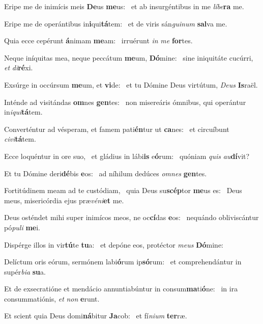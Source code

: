 \item Eripe me de inimícis meis \textbf{De}us \textbf{me}us:~\psstar{} et ab insurgéntibus in me \textit{líbe}\textbf{ra} me.
\item Eripe me de operántibus in\textbf{i}qui\textbf{tá}tem:~\psstar{} et de viris sán\textit{guinum} \textbf{sal}va me.
\item Quia ecce cepérunt \textbf{á}nimam \textbf{me}am:~\psstar{} irruérunt \textit{in} \textit{me} \textbf{for}tes.
\item Neque iníquitas mea, neque peccátum \textbf{me}um, \textbf{Dó}mine:~\psstar{} sine iniquitáte cucúrri, \textit{et} \textit{di}\textbf{ré}xi.
\item Exsúrge in occúrsum \textbf{me}um, et \textbf{vi}de:~\psstar{} et tu Dómine Deus virtútum, \textit{Deus} \textbf{Is}raël.
\item Inténde ad visitándas \textbf{om}nes \textbf{gen}tes:~\psstar{} non misereáris ómnibus, qui operántur in\textit{iqui}\textbf{tá}tem.
\item Converténtur ad vésperam, et famem pati\textbf{én}tur ut \textbf{ca}nes:~\psstar{} et circuíbunt \textit{civi}\textbf{tá}tem.
\item Ecce loquéntur in ore suo,~\pscross{} et gládius in lábi\textbf{is} e\textbf{ó}rum:~\psstar{} quóniam \textit{quis} \textit{au}\textbf{dí}vit?
\item Et tu Dómine deri\textbf{dé}bis \textbf{e}os:~\psstar{} ad níhilum dedúces \textit{omnes} \textbf{gen}tes.
\item Fortitúdinem meam ad te custódiam,~\pscross{} quia Deus su\textbf{scép}tor \textbf{me}us es:~\psstar{} Deus meus, misericórdia ejus præ\textit{véni}\textbf{et} me.
\item Deus osténdet mihi super inimícos meos, ne oc\textbf{cí}das \textbf{e}os:~\psstar{} nequándo obliviscántur pó\textit{puli} \textbf{me}i.
\item Dispérge illos in vir\textbf{tú}te \textbf{tu}a:~\psstar{} et depóne eos, protéctor \textit{meus} \textbf{Dó}mine:
\item Delíctum oris eórum, sermónem labi\textbf{ó}rum ip\textbf{só}rum:~\psstar{} et comprehendántur in supér\textit{bia} \textbf{su}a.
\item Et de exsecratióne et mendácio annuntiabúntur in consum\textbf{ma}ti\textbf{ó}ne:~\psstar{} in ira consummatiónis, \textit{et} \textit{non} \textbf{e}runt.
\item Et scient quia Deus domi\textbf{ná}bitur \textbf{Ja}cob:~\psstar{} et fí\textit{nium} \textbf{ter}ræ.
